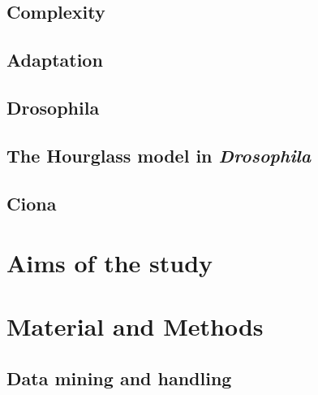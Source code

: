 \documentclass[officiallayout]{tktla_modified}
\begin{document}
%	
	
%	
\section{Complexity}
	
	\clearpage 
\section{Adaptation}
	
\section{Drosophila}
	
\section{The Hourglass model in \textit{Drosophila} }
	
\section{Ciona}
	
	\clearpage

\chapter{Aims of the study}



\chapter{Material and Methods}
	\section{Data mining and handling}
	
		
\end{document}
